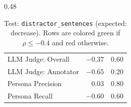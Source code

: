\begin{table}[htbp]
\begin{subtable}[t]{0.48\textwidth}
\begin{tabular}{lrr}
\rowcolor{matchFalse} LLM Judge: Overall                    &  $-0.37$ &  0.60 \\
\rowcolor{matchTrue} LLM Judge: Annotator        &  $-0.65$ &  0.20 \\
\rowcolor{matchFalse} Persona Precision                     &   $0.03$ &  0.80 \\
\rowcolor{matchTrue} Persona Recall                        &  $-0.60$ &  0.60 \\
\bottomrule
\end{tabular}
\caption{LLM metrics}
\end{subtable}
\caption[Test: \texttt{distractor\_sentences} (expected: decrease).]{Test: \texttt{distractor\_sentences} (expected: decrease). Rows are colored green if $\rho\leq-0.4$ and red otherwise.}
\label{tab:distractor_sentences}
\end{table}


